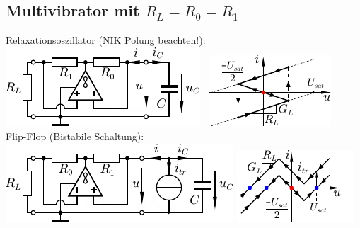 \documentclass[6pt,a4paper]{scrartcl}
\begin{document}
\begin{multicols}{4}
	\subsection{Multivibrator mit $R_L = R_0 = R_1$}
	Relaxationsoszillator (NIK Polung beachten!):\\
	\includegraphics[scale = 0.8]{./img/astablemultivib.pdf} \ \includegraphics[scale = 0.9]{./img/char/char_astablemultivib.pdf}\\
	Flip-Flop (Bistabile Schaltung):\\
	\includegraphics[scale = 0.8]{./img/bistablemultivib.pdf}  \includegraphics[scale = 0.9]{./img/char/char_bistablemultivib.pdf}

	

\end{multicols}
\end{document}
